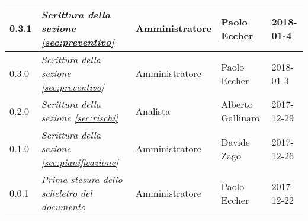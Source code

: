 \begin{table}[H]
\begin{tabular}{C{2cm}|C{4cm}|C{3cm}|C{3cm}|R{2cm}}
		0.3.1 &\emph{Scrittura della sezione \ref{sec:preventivo}} & Amministratore & Paolo Eccher  & 2018-01-4 \\
		\hline
		
		0.3.0 &\emph{Scrittura della sezione \ref{sec:preventivo}} & Amministratore & Paolo Eccher & 2018-01-3 \\
		\hline
		
		0.2.0 &\emph{Scrittura della sezione \ref{sec:rischi}} & Analista & Alberto Gallinaro & 2017-12-29 \\
		\hline
		
		0.1.0 &\emph{Scrittura della sezione \ref{sec:pianificazione}} & Amministratore & Davide Zago & 2017-12-26 \\
		\hline
		
		0.0.1 &\emph{Prima stesura dello scheletro del documento} & Amministratore & Paolo Eccher & 2017-12-22 \\
		
	\end{tabular}
	
\end{table}


\clearpage